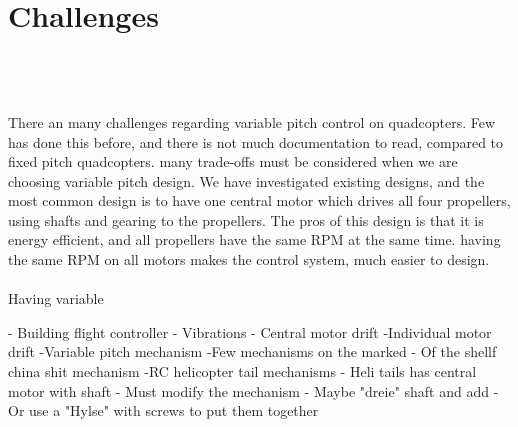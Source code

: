 \section{Challenges}\\\\\\
There an many challenges regarding variable pitch control on quadcopters. Few has done this before, and there is not much documentation to read, compared to fixed pitch quadcopters. many trade-offs must be considered when we are choosing variable pitch design. We have investigated existing designs, and the most common design is to have one central motor which drives all four propellers, using shafts and gearing to the propellers. The pros of this design is that it is energy efficient, and all propellers have the same RPM at the same time. having the same RPM on all motors makes the control system, much easier to design.\\ \\ Having variable 






    - Building flight controller
    - Vibrations
    - Central motor drift
    -Individual motor drift
    -Variable pitch mechanism
        -Few mechanisms on the marked
        - Of the shellf china shit mechanism
        -RC helicopter tail mechanisms
            - Heli tails has central motor with shaft
            - Must modify the mechanism
            - Maybe "dreie" shaft and add
            -Or use a "Hylse" with screws to put them together
    